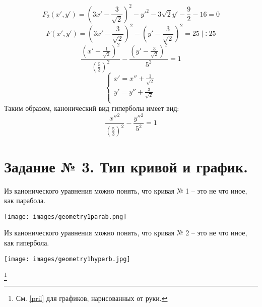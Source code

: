 \documentclass{article}
\theoremstyle{plain}
\begin{document}
\begin{enumerate}
    $$F_2(x', y') = (3x' - \frac{3}{\sqrt{2}})^2 - y'^2 - 3\sqrt{2}y' - \frac{9}{2} - 16 = 0$$
    $$F(x', y') = (3x' - \frac{3}{\sqrt{2}})^2 - (y' - \frac{3}{\sqrt{2}})^2 = 25 \;| \div 25$$
    $$\frac{ (x' - \frac{1}{\sqrt{2}})^2 }{(\frac{5}{3})^2} - \frac{ (y' - \frac{ 3 }{\sqrt{2}})^2}{5^2} = 1$$
    \begin{equation}
        \begin{cases}
        x' = x'' + \frac{1}{\sqrt{2}}\\
        y' = y'' + \frac{3}{\sqrt{2}}\\
        \end{cases}
    \end{equation}
    Таким образом, канонический вид гиперболы имеет вид:
    $$\frac{x''^2}{(\frac{5}{3})^2} - \frac{y''^2}{5^2} = 1$$
    \newpage
    \section{Задание № 3. Тип кривой и график.}
    Из канонического уравнения можно понять, что кривая № 1 -- это не что иное, как парабола.
    \begin{center}
    \texttt{[image: images/geometry1parab.png]}
    \end{center}
    \newpage
    Из канонического уравнения можно понять, что кривая № 2 -- это не что иное, как гипербола.
    \begin{center}
    \texttt{[image: images/geometry1hyperb.jpg]}
    \end{center}
    \vspace{3cm}
    \footnote{\large{См. \ref{pril} для графиков, нарисованных от руки.}}
    \newpage

\end{enumerate}
\end{document}
